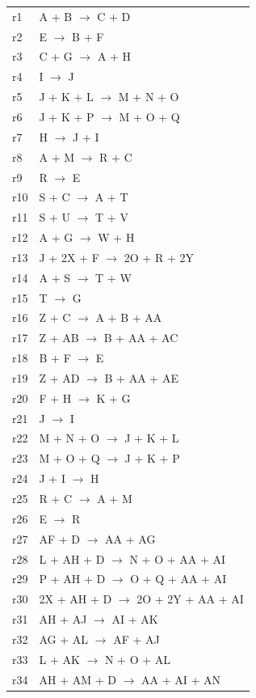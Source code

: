 \documentclass[pdflatex,referee]{../template/sn-jnl}
\theoremstyle{plain}%
\theoremstyle{definition}%
\theoremstyle{remark}%
\begin{document}
\begin{longtable}{@{}>{\centering\arraybackslash}p{1.5cm}%
                  >{\raggedright\arraybackslash}p{11.1cm}@{}}
r1 & A + B \(\rightarrow\) C + D \\
r2 & E \(\rightarrow\) B + F \\
r3 & C + G \(\rightarrow\) A + H \\
r4 & I \(\rightarrow\) J \\
r5 & J + K + L \(\rightarrow\) M + N + O \\
r6 & J + K + P \(\rightarrow\) M + O + Q \\
r7 & H \(\rightarrow\) J + I \\
r8 & A + M \(\rightarrow\) R + C \\
r9 & R \(\rightarrow\) E \\
r10 & S + C \(\rightarrow\) A + T \\
r11 & S + U \(\rightarrow\) T + V \\
r12 & A + G \(\rightarrow\) W + H \\
r13 & J + 2X + F \(\rightarrow\) 2O + R + 2Y \\
r14 & A + S \(\rightarrow\) T + W \\
r15 & T \(\rightarrow\) G \\
r16 & Z + C \(\rightarrow\) A + B + AA \\
r17 & Z + AB \(\rightarrow\) B + AA + AC \\
r18 & B + F \(\rightarrow\) E \\
r19 & Z + AD \(\rightarrow\) B + AA + AE \\
r20 & F + H \(\rightarrow\) K + G \\
r21 & J \(\rightarrow\) I \\
r22 & M + N + O \(\rightarrow\) J + K + L \\
r23 & M + O + Q \(\rightarrow\) J + K + P \\
r24 & J + I \(\rightarrow\) H \\
r25 & R + C \(\rightarrow\) A + M \\
r26 & E \(\rightarrow\) R \\
r27 & AF + D \(\rightarrow\) AA + AG \\
r28 & L + AH + D \(\rightarrow\) N + O + AA + AI \\
r29 & P + AH + D \(\rightarrow\) O + Q + AA + AI \\
r30 & 2X + AH + D \(\rightarrow\) 2O + 2Y + AA + AI \\
r31 & AH + AJ \(\rightarrow\) AI + AK \\
r32 & AG + AL \(\rightarrow\) AF + AJ \\
r33 & L + AK \(\rightarrow\) N + O + AL \\
r34 & AH + AM + D \(\rightarrow\) AA + AI + AN \\
\end{longtable}
\end{document}
